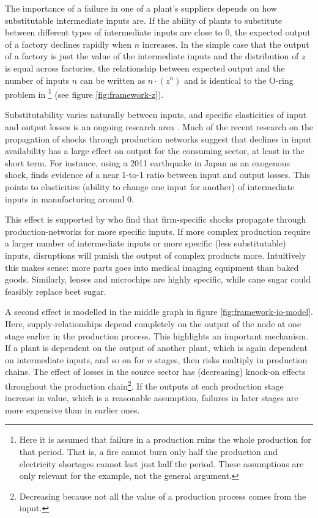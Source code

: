 \documentclass[11pt]{article}
\begin{document}
The importance of a failure in one of a plant's suppliers depends on how substitutable intermediate inputs are. If the ability of plants to substitute between different types of intermediate inputs are close to 0, the expected output of a factory declines rapidly when \(n\) increases. In the simple case that the output of a factory is just the value of the intermediate inputs and the distribution of \(z\) is equal across factories, the relationship between expected output and the number of inputs \(n\) can be written as \(n\cdot(z^{n})\) and is identical to the O-ring problem in \cite{kremer_o-ring_1993}\footnote{Here it is assumed that failure in a production ruins the whole production for that period. That is, a fire cannot burn only half the production and electricity shortages cannot last just half the period. These assumptions are only relevant for the example, not the general argument.} (see figure \ref{fig:framework-z}).

Substitutability varies naturally between inputs, and specific elasticities of input and output losses is an ongoing research area \citep{brummitt_contagious_2017,carvalho_micro_2014}. Much of the recent research on the propagation of shocks through production networks suggest that declines in input availability has a large effect on output for the consuming sector, at least in the short term. For instance, using a 2011 earthquake in Japan as an exogenous shock, \cite{boehm_input_2019-1} finds evidence of a near 1-to-1 ratio between input and output losses. This points to elasticities (ability to change one input for another) of intermediate inputs in manufacturing around 0.

This effect is supported by \cite{barrot_input_2016} who find that firm-specific shocks propagate through production-networks for more specific inputs. If more complex production require a larger number of intermediate inputs or more specific (less substitutable) inputs, disruptions will punish the output of complex products more. Intuitively this makes sense: more parts goes into medical imaging equipment than baked goods. Similarly, lenses and microchips are highly specific, while cane sugar could feasibly replace beet sugar.

A second effect is modelled in the middle graph in figure \ref{fig:framework-io-model}. Here, supply-relationships depend completely on the output of the node at one stage earlier in the production process. This highlights an important mechanism. If a plant is dependent on the output of another plant, which is again dependent on intermediate inputs, and so on for \(n\) stages, then risks multiply in production chains. The effect of losses in the source sector has (decreasing) knock-on effects throughout the production chain\footnote{Decreasing because not all the value of a production process comes from the input.}. If the outputs at each production stage increase in value, which is a reasonable assumption, failures in later stages are more expensive than in earlier ones.
\end{document}
